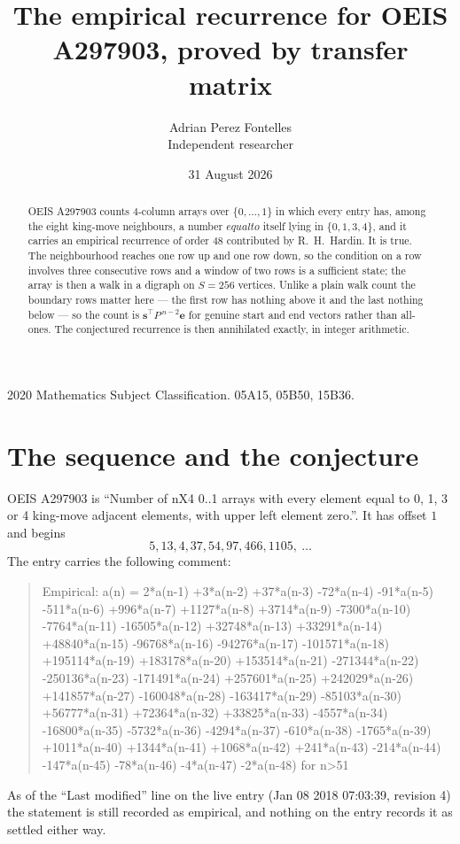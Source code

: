 \documentclass[11pt,a4paper]{article}
\title{The empirical recurrence for OEIS A297903, proved by transfer matrix}
\author{Adrian Perez Fontelles\\ \small Independent researcher}
\date{31 August 2026}
\theoremstyle{plain}
\theoremstyle{definition}
\begin{document}
\maketitle

\begin{abstract}
OEIS A297903 counts $4$-column arrays over $\{0,\dots,1\}$ in which every entry has,
among the eight king-move neighbours, a number $equal to$ itself lying in $\{0,1,3,4\}$, and it carries an empirical
recurrence of order $48$ contributed by R.~H.~Hardin. It is true. The neighbourhood
reaches one row up and one row down, so the condition on a row involves three consecutive
rows and a window of two rows is a sufficient state; the array is then a walk in a digraph
on $S=256$ vertices. Unlike a plain walk count the boundary rows matter here --- the first
row has nothing above it and the last nothing below --- so the count is
$\mathbf{s}^{\!\top}P^{\,n-2}\mathbf{e}$ for genuine start and end vectors rather than
all-ones. The conjectured recurrence is then annihilated exactly, in integer arithmetic.
\end{abstract}

\noindent\small 2020 Mathematics Subject Classification. 05A15, 05B50, 15B36.\normalsize

\section{The sequence and the conjecture}

OEIS A297903 is ``Number of nX4 0..1 arrays with every element equal to 0, 1, 3 or 4 king-move adjacent elements, with upper left element zero.''. It has offset
$1$ and begins
\[
5, 13, 4, 37, 54, 97, 466, 1105,\ \dots
\]
The entry carries the following comment:
\begin{quote}\small
Empirical: a(n) = 2*a(n-1) +3*a(n-2) +37*a(n-3) -72*a(n-4) -91*a(n-5) -511*a(n-6) +996*a(n-7) +1127*a(n-8) +3714*a(n-9) -7300*a(n-10) -7764*a(n-11) -16505*a(n-12) +32748*a(n-13) +33291*a(n-14) +48840*a(n-15) -96768*a(n-16) -94276*a(n-17) -101571*a(n-18) +195114*a(n-19) +183178*a(n-20) +153514*a(n-21) -271344*a(n-22) -250136*a(n-23) -171491*a(n-24) +257601*a(n-25) +242029*a(n-26) +141857*a(n-27) -160048*a(n-28) -163417*a(n-29) -85103*a(n-30) +56777*a(n-31) +72364*a(n-32) +33825*a(n-33) -4557*a(n-34) -16800*a(n-35) -5732*a(n-36) -4294*a(n-37) -610*a(n-38) -1765*a(n-39) +1011*a(n-40) +1344*a(n-41) +1068*a(n-42) +241*a(n-43) -214*a(n-44) -147*a(n-45) -78*a(n-46) -4*a(n-47) -2*a(n-48) for n>51
\end{quote}
As of the ``Last modified'' line on the live entry (Jan 08 2018 07:03:39, revision
4) the statement is still recorded as empirical, and nothing on the entry
records it as settled either way.
\end{document}
